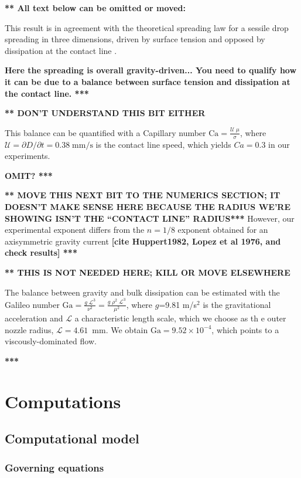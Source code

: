 \documentclass[aip,graphicx]{revtex4-1}
\newcommand{\sym}[1]{\text{#1}} \newcommand{\dif}{\mathrm{d}}
\begin{document}
{\bf *** All text below can be omitted or moved:} 

This result is in agreement with the
theoretical spreading law for a sessile drop spreading in three
dimensions, driven by surface tension and opposed by dissipation at
the contact line \cite{bonn2009wetting, cazabat1986dynamics}. 

{\bf Here the spreading is overall gravity-driven... You need to qualify how it can be due to a balance between surface tension and dissipation at the contact line. ***}

{\bf *** DON'T UNDERSTAND THIS BIT EITHER}

 This
balance can be quantified with a Capillary number $\displaystyle
\sym{Ca} = \frac{\mathcal{U} \; \mu}{\sigma}$, where
$\mathcal{U}=\partial D/ \partial t=0.38 \; \sym{mm/s}$ is the contact
line speed, which yields $Ca=0.3$ in our experiments.

{\bf OMIT? ***}


{\bf *** MOVE THIS NEXT BIT TO THE NUMERICS SECTION; IT DOESN'T MAKE SENSE
HERE BECAUSE THE RADIUS WE'RE SHOWING ISN'T THE ``CONTACT LINE''
RADIUS*** } However, our
experimental exponent differs from the $n=1/8$ exponent obtained for
an axisymmetric gravity current {\bf [cite Huppert1982, Lopez et al
    1976, and check results] ***} 


{\bf *** THIS IS NOT NEEDED HERE; KILL OR MOVE ELSEWHERE }

The balance between gravity and bulk dissipation can be estimated with
the Galileo number $\displaystyle \sym{Ga} = \frac{g \;
  \mathcal{L}^3}{\nu^2} = \frac{g \; \rho^2 \; \mathcal{L}^3}{\mu^2}$,
where $g$=9.81 m/s$^2$ is the gravitational acceleration and
$\mathcal{L}$ a characteristic length scale, which we choose as th e
outer nozzle radius, $\mathcal{L}=4.61$~mm.  We obtain $\sym{Ga}=9.52
\times 10^{-4}$, which points to a viscously-dominated flow.

{\bf ****}


\section{Computations}

\subsection{Computational model}

\subsubsection{Governing equations}
\end{document}
